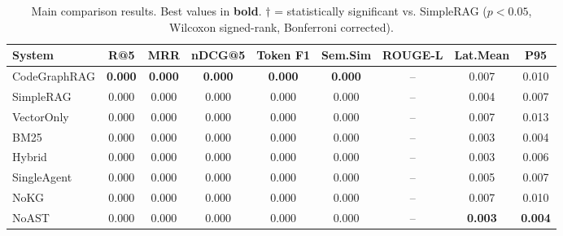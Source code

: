 \begin{table}[t]
\centering
\caption{Main comparison results. Best values in \textbf{bold}. 
$\dagger$ = statistically significant vs. SimpleRAG ($p < 0.05$, Wilcoxon signed-rank, Bonferroni corrected).}
\begin{tabular}{lcccccccc}
\toprule
System & R@5 & MRR & nDCG@5 & Token F1 & Sem.Sim & ROUGE-L & Lat.Mean & P95 \\
\midrule
CodeGraphRAG & \textbf{0.000} & \textbf{0.000} & \textbf{0.000} & \textbf{0.000} & \textbf{0.000} & -- & 0.007 & 0.010 \\
SimpleRAG & 0.000 & 0.000 & 0.000 & 0.000 & 0.000 & -- & 0.004 & 0.007 \\
VectorOnly & 0.000 & 0.000 & 0.000 & 0.000 & 0.000 & -- & 0.007 & 0.013 \\
BM25 & 0.000 & 0.000 & 0.000 & 0.000 & 0.000 & -- & 0.003 & 0.004 \\
Hybrid & 0.000 & 0.000 & 0.000 & 0.000 & 0.000 & -- & 0.003 & 0.006 \\
SingleAgent & 0.000 & 0.000 & 0.000 & 0.000 & 0.000 & -- & 0.005 & 0.007 \\
NoKG & 0.000 & 0.000 & 0.000 & 0.000 & 0.000 & -- & 0.007 & 0.010 \\
NoAST & 0.000 & 0.000 & 0.000 & 0.000 & 0.000 & -- & \textbf{0.003} & \textbf{0.004} \\
\bottomrule
\end{tabular}
\end{table}